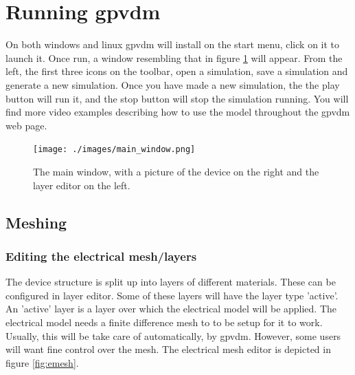\documentclass[11pt]{article}
\begin{document}


\section{Running gpvdm}
On both windows and linux gpvdm will install on the start menu, click on it to launch it.  Once run, a window resembling that in figure \ref{fig:mainwindow} will appear.  From the left, the first three icons on the toolbar, open a simulation, save a simulation and generate a new simulation.  Once you have made a new simulation, the the play button will run it, and the stop button will stop the simulation running.  You will find more video examples describing how to use the model throughout the gpvdm web page.

\begin{figure}[ht!]
\centering
\texttt{[image: ./images/main\_window.png]}
\caption{The main window, with a picture of the device on the right and the layer editor on the left.}
\label{fig:mainwindow}
\end{figure}




\subsection{Meshing}
\subsubsection{Editing the electrical mesh/layers}
The device structure is split up into layers of different materials.  These can be configured in layer editor.  Some of these layers will have the layer type 'active'.  An 'active' layer is a layer over which the electrical model will be applied.  The electrical model needs a finite difference mesh to to be setup for it to work.  Usually, this will be take care of automatically, by gpvdm.  However, some users will want fine control over the mesh.  The electrical mesh editor is depicted in figure \ref{fig:emesh}.
\end{document}
